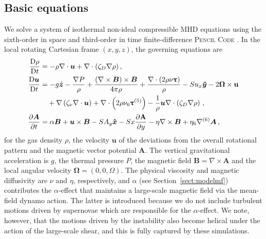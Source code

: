 \documentclass[fleqn,usenatbib]{mnras}
\newcommand\deriv[2]{\frac{\partial#1}{\partial#2}}%
\newcommand\dderiv[2]{\frac{\text{D}#1}{\text{D}#2}}%
\renewcommand\vec[1]{\bm{#1}}%
\newcommand{\BB}{\vec{B}} %
\newcommand{\U}{\vec{u}} %
\renewcommand{\mathbfss}[1]{{{\mbox{\boldmath{$#1$}}}}}
\begin{document}
\subsection{Basic equations}

We solve a system of isothermal non-ideal compressible MHD equations using the
sixth-order in space and third-order in time finite-difference \textsc{Pencil
Code} \citep{brandenburg2002,Pencil-JOSS}.  In the local rotating Cartesian
frame $(x,y,z)$, the governing equations are
\begin{align}
    \dderiv{\rho}{t} &= -\rho\nabla \cdot \U +\nabla \cdot(\zeta_D\nabla\rho)\,,
            \label{eq:mass_conservation}\\
    \dderiv{\U}{t} &= -g\hat{\vec{z}} - \frac{\nabla P}{\rho}
        +\frac{(\nabla\times\BB)\times\BB}{4\pi\rho}
        +\frac{\nabla\cdot(2\rho\nu{\mathbfss{\uptau}})}{\rho}
        -Su_x\vec{\hat{y}}
        -2\vec{\Omega}\times \mathbf{u}        \nonumber\\
    \label{eq:momentum}
        &\mbox{}\quad +\nabla\left(\zeta_{\nu}\nabla \cdot \U \right)
        +\nabla\cdot \left(2\rho\nu_6{\mathbfss{\uptau}}^{(5)}\right)
        -\dfrac{1}{\rho}\U\nabla\cdot\left(\zeta_D\nabla\rho\right)\,,\\
    \deriv{\vec{A}}{t} &=  \alpha \BB+ \U\times \BB - SA_y\vec{\hat{{x}}} - Sx\frac{\partial \mathbf{A}}{\partial y} -\eta \nabla\times \BB
    \label{eq:induction}
    +\eta_6\nabla^{(6)}\vec{A}\,,
\end{align}
for the gas density $\rho$, the velocity $\vec{u}$ of the deviations from the
overall rotational pattern and the magnetic vector potential $\vec{A}$. The
vertical gravitational acceleration is $g$, the thermal pressure $P$, the
magnetic field $\BB=\nabla\times\vec{A}$  and the local angular velocity
$\vec{\Omega}=(0,0,\Omega)$. The physical viscosity and magnetic diffusivity
are $\nu$ and $\eta$, respectively, and $\alpha$ (see
Section~\ref{sect:modelmf}) contributes the $\alpha$-effect that maintains a
large-scale magnetic field via the mean-field dynamo action. The latter is
introduced because we do not include turbulent motions driven by supernovae
which are responsible for the $\alpha$-effect. We note, however, that the
motions driven by the instability also become helical under the action of the
large-scale shear, and this is fully captured by these simulations.
\end{document}
